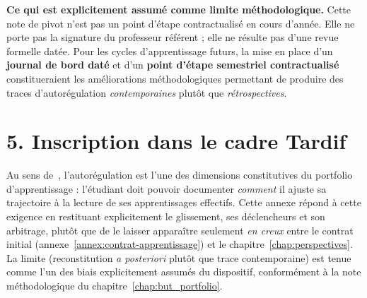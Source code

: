 \textbf{Ce qui est explicitement assumé comme limite méthodologique.} Cette note de pivot n'est pas un point d'étape contractualisé en cours d'année. Elle ne porte pas la signature du professeur référent ; elle ne résulte pas d'une revue formelle datée. Pour les cycles d'apprentissage futurs, la mise en place d'un \textbf{journal de bord daté} et d'un \textbf{point d'étape semestriel contractualisé} constitueraient les améliorations méthodologiques permettant de produire des traces d'autorégulation \emph{contemporaines} plutôt que \emph{rétrospectives}.

\section*{5. Inscription dans le cadre Tardif}

Au sens de~\citet{tardif2006}, l'autorégulation est l'une des dimensions constitutives du portfolio d'apprentissage : l'étudiant doit pouvoir documenter \emph{comment} il ajuste sa trajectoire à la lecture de ses apprentissages effectifs. Cette annexe répond à cette exigence en restituant explicitement le glissement, ses déclencheurs et son arbitrage, plutôt que de le laisser apparaître seulement \emph{en creux} entre le contrat initial (annexe~\ref{annex:contrat-apprentissage}) et le chapitre~\ref{chap:perspectives}. La limite (reconstitution \emph{a posteriori} plutôt que trace contemporaine) est tenue comme l'un des biais explicitement assumés du dispositif, conformément à la note méthodologique du chapitre~\ref{chap:but_portfolio}.



